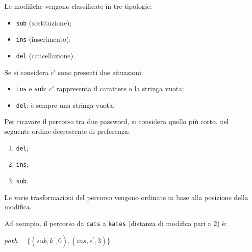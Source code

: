 Le modifiche vengono classificate in tre tipologie:
\begin{itemize}
    \item \texttt{sub} (sostituzione);
    \item \texttt{ins} (inserimento);
    \item \texttt{del} (cancellazione).
\end{itemize}

Se si considera $c'$ sono presenti due situazioni:
\begin{itemize}
    \item \texttt{ins} e \texttt{sub}: $c'$ rappresenta il carattere o la stringa vuota;
    \item \texttt{del}: è sempre una stringa vuota.
\end{itemize}

Per ricavare il percorso tra due password, si considera quello più corto, nel seguente ordine decrescente di preferenza:
\begin{enumerate}
    \item \texttt{del};
    \item \texttt{ins};
    \item \texttt{sub}.
\end{enumerate}

Le varie trasformazioni del percorso vengono ordinate in base alla posizione della modifica.

Ad esempio, il percorso da \texttt{cats} a \texttt{kates} (distanza di modifica pari a 2) è:
\begin{center}
    $path = \{(sub , k^\prime , 0), (ins , e^\prime , 3)\}$
\end{center}

